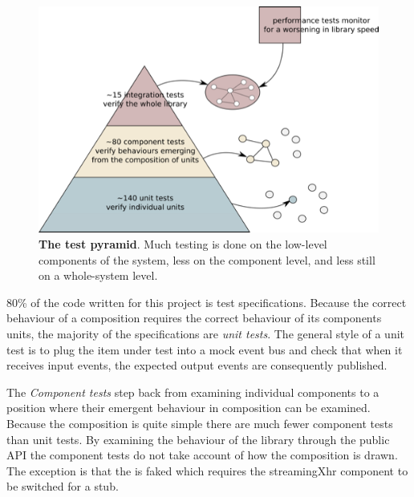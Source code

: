 \documentclass[]{article}
\makeatletter
\def\maxwidth{\ifdim\Gin@nat@width>\linewidth\linewidth
\else\Gin@nat@width\fi}
\let\Oldincludegraphics\includegraphics
\renewcommand{\includegraphics}[1]{\Oldincludegraphics[width=\maxwidth]{#1}}
\makeatother
\begin{document}
\begin{figure}[htbp]
\centering
\includegraphics{images/testPyramid.png}
\caption{\textbf{The test pyramid}. Much testing is done on the
low-level components of the system, less on the component level, and
less still on a whole-system level. \label{testpyramid}}
\end{figure}

80\% of the code written for this project is test specifications.
Because the correct behaviour of a composition requires the correct
behaviour of its components units, the majority of the specifications
are \emph{unit tests}. The general style of a unit test is to plug the
item under test into a mock event bus and check that when it receives
input events, the expected output events are consequently published.

The \emph{Component tests} step back from examining individual
components to a position where their emergent behaviour in composition
can be examined. Because the composition is quite simple there are much
fewer component tests than unit tests. By examining the behaviour of the
library through the public API the component tests do not take account
of how the composition is drawn. The exception is that the is faked
which requires the streamingXhr component to be switched for a stub.
\end{document}
